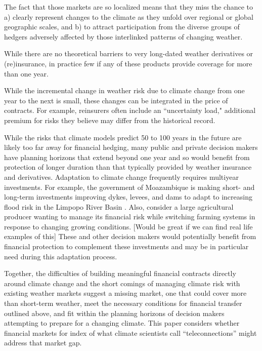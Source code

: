 \documentclass[authoryear]{article}
\begin{document}
The fact that those markets are so localized means that they miss the chance to a) clearly represent changes to the climate as they unfold over regional or global geographic scales, and b) to attract participation from the diverse groups of hedgers adversely affected by those interlinked patterns of changing weather.

While there are no theoretical barriers to very long-dated weather derivatives or (re)insurance, in practice few if any of these products provide coverage for more than one year.

While the incremental change in weather risk due to climate change from one year to the next is small, these changes can be integrated in the price of contracts. For example, reinsurers often include an ``uncertainty load," additional premium for risks they believe may differ from the historical record.

While the risks that climate models predict 50 to 100 years in the future are likely too far away for financial hedging, many public and private decision makers have planning horizons that extend beyond one year and so would benefit from protection of longer duration than that typically provided by weather insurance and derivatives. Adaptation to climate change frequently requires multiyear investments. For example, the government of Moazambique is making short- and long-term investments improving dykes, levees, and dams to adapt to increasing flood risk in the Limpopo River Basin \citep{worldBank2013limpopo}. Also, consider a large agricultural producer wanting to manage its financial risk while switching farming systems in response to changing growing conditions. [Would be great if we can find real life examples of this] These and other decision makers would potentially benefit from financial protection to complement these investments and may be in particular need during this adaptation process.

Together, the difficulties of building meaningful financial contracts directly around climate change and the short comings of managing climate risk with existing weather markets suggest a missing market, one that could cover more than short-term weather, meet the necessary conditions for financial transfer outlined above, and fit within the planning horizons of decision makers attempting to prepare for a changing climate. This paper considers whether financial markets for index of what climate scientists call ``teleconnections'' might address that market gap.
\end{document}
